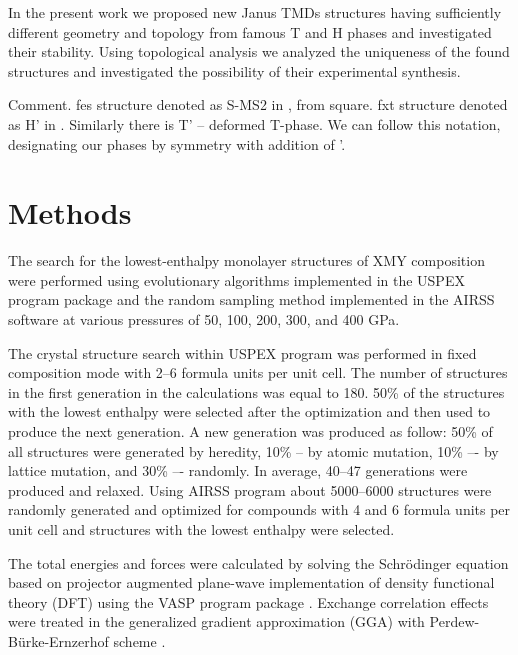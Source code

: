 \documentclass[a4paperm]{article}
\begin{document}
In the present work we proposed new Janus TMDs structures having sufficiently different geometry and topology from famous T and H phases and  investigated their stability. Using topological analysis we analyzed the uniqueness of the found structures and investigated the possibility of their experimental synthesis.


Comment. 
fes structure denoted as S-MS2 in \cite{tang2021_smose}, from square.
fxt structure denoted as H' in \cite{ma2016_h'}.
Similarly there is T' – deformed T-phase.
We can follow this notation, designating our phases by symmetry with addition of '.

		\section{Methods}
The search for the lowest-enthalpy monolayer structures of XMY composition were performed using evolutionary algorithms implemented in the USPEX program package \cite{uspex1,uspex2,uspex3} and the random sampling method implemented in the AIRSS software \cite{airss1,airss2} at various pressures of 50, 100, 200, 300, and 400 GPa.

The crystal structure search within USPEX program was performed in fixed composition mode with 2--6 formula units per unit cell.
The number of structures in the first generation in the calculations was equal to 180.
50\% of the structures with the lowest enthalpy were selected after the optimization and then used to produce the next generation.
A new generation was produced as follow: 50\% of all structures were generated by heredity, 10\% -- by atomic mutation, 10\% –- by lattice mutation, and 30\% –- randomly.
In average, 40--47 generations were produced and relaxed.
Using AIRSS program about 5000--6000 structures were randomly generated and optimized for compounds with 4 and 6 formula units per unit cell and structures with the lowest enthalpy were selected.

The total energies and forces were calculated by solving the Schr\"{o}dinger equation based on projector augmented plane-wave implementation \cite{blochl1994projector} of density functional theory (DFT) using the VASP program package \cite{vasp1,vasp2}.
Exchange correlation effects were treated in the generalized gradient approximation (GGA) with Perdew-B\"{u}rke-Ernzerhof scheme \cite{pbe}.
\end{document}
